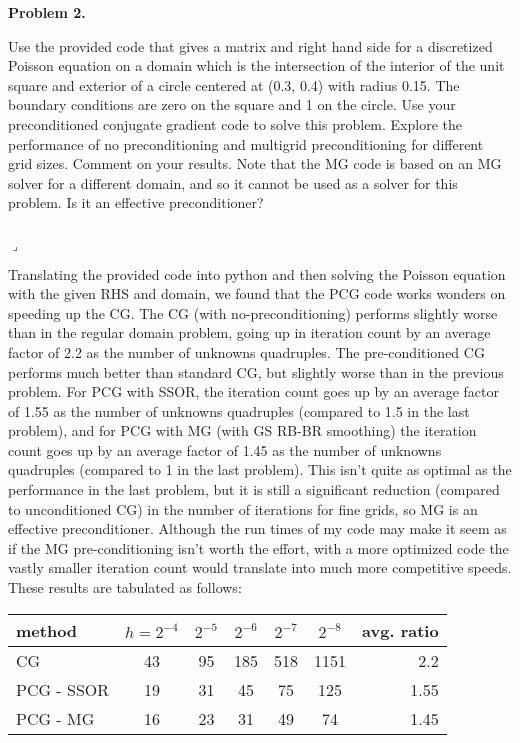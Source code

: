 \documentclass[12pt]{article}
\newenvironment{myprob}[1]
    {%
    \noindent{\Huge$\ulcorner$}\textbf{#1.}\begin{em}
    }
    { 
    \end{em} \\ \hphantom{l} \hfill {\Huge$\lrcorner$} }
\begin{document}
\newpage
\begin{myprob}{Problem 2}
Use the provided code that gives a matrix and right hand side for a discretized Poisson equation on a domain which is the intersection of the interior of the unit square and exterior of a circle centered at (0.3, 0.4) with radius 0.15. The boundary conditions are zero on the square and 1 on the circle. Use your preconditioned conjugate gradient code to solve this problem. Explore the performance of no preconditioning and multigrid preconditioning for different grid sizes. Comment on your results. Note that the MG code is based on an MG solver for a different domain, and so it cannot be used as a solver for this problem. Is it an effective preconditioner?
\end{myprob}


Translating the provided code into python and then solving the Poisson equation with the given RHS and domain, we found that the PCG code works wonders on speeding up the CG. The CG (with no-preconditioning) performs slightly worse than in the regular domain problem, going up in iteration count by an average factor of 2.2 as the number of unknowns quadruples. The pre-conditioned CG performs much better than standard CG, but slightly worse than in the previous problem.  For PCG with SSOR, the iteration count goes up by an average factor of 1.55 as the number of unknowns quadruples (compared to 1.5 in the last problem), and for PCG with MG (with GS RB-BR smoothing) the iteration count goes up by an average factor of 1.45 as the number of unknowns quadruples (compared to 1 in the last problem).  This isn't quite as optimal as the performance in the last problem, but it is still a significant reduction (compared to unconditioned CG) in the number of iterations for fine grids, so MG is an effective preconditioner.  Although the run times of my code may make it seem as if the MG pre-conditioning isn't worth the effort, with a more optimized code the vastly smaller iteration count would translate into much more competitive speeds.  These results are tabulated as follows:

\begin{center}
\begin{tabular}{||l|ccccc|r||}
\hline \hline
  method & $h = 2^{-4}$ & $2^{-5}$ & $2^{-6}$ & $2^{-7}$ & $2^{-8}$ & avg. ratio \\
  \hline \hline
  CG  & 43 & 95 & 185 & 518 & 1151 & 2.2 \\
  PCG - SSOR & 19 & 31 & 45 & 75 & 125 & 1.55 \\
  PCG - MG & 16 & 23 & 31 & 49 & 74 & 1.45 \\
  \hline \hline
\end{tabular}
\end{center}
\end{document}
